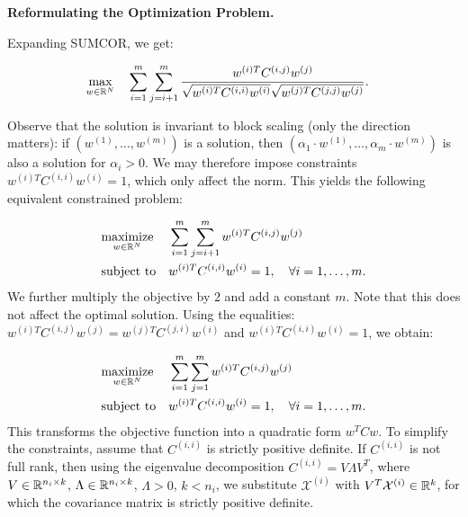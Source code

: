\noindent\textbf{Reformulating the Optimization Problem.}
\begin{sloppypar}
Expanding SUMCOR, we get:

\begin{equation*}
\begin{aligned}
& \underset{w \in \mathbb{R}^N}{\text{max}} & & \sum_{i = 1}^m
  \sum_{j = i+1}^m \frac{w^{(i)T} C^{(i,j)}
    w^{(j)}}{\sqrt{w^{(i)T} C^{(i,i)} w^{(i)}} \sqrt{w^{(j)T}
      C^{(j,j)} w^{(j)}}}.
\end{aligned}
\end{equation*}

Observe that the solution is invariant to block scaling (only the direction matters):
if $\left(w^{(1)}, \ldots, w^{(m)}\right)$ is a solution, then
$\left(\alpha_1 \cdot w^{(1)}, \ldots, \alpha_m \cdot w^{(m)}\right)$ is also a
solution for $\alpha_i > 0$. We may therefore impose constraints $w^{(i)T}C^{(i,i)}w^{(i)} = 1$,
which only affect the norm.
This yields the following  equivalent constrained problem:
\end{sloppypar} 
\begin{equation}\label{eq:qcqp0}
\begin{aligned}
& \underset{w \in \mathbb{R}^N}{\text{maximize}}
& & \sum_{i = 1}^m \sum_{j = i+1}^m w^{(i)T} C^{(i,j)} w^{(j)}\\
& \text{subject to}
& &w^{(i)T} C^{(i,i)} w^{(i)} = 1, \quad\forall i = 1,\ldots, m.
\end{aligned}
\end{equation}
We further multiply the objective by $2$ and add a constant $m$. Note that this does not
affect the optimal solution. Using the equalities: $w^{(i)T} C^{(i,j)} w^{(j)} = w^{(j)T} C^{(j,i)} w^{(i)}$
and $w^{(i)T} C^{(i,i)} w^{(i)} = 1$, we obtain:

\begin{equation}\label{eq:qcqp05}
\begin{aligned}
& \underset{w \in \mathbb{R}^N}{\text{maximize}}
& & \sum_{i = 1}^m \sum_{j = 1}^m w^{(i)T} C^{(i,j)} w^{(j)}\\
& \text{subject to}
& &w^{(i)T} C^{(i,i)} w^{(i)} = 1, \quad\forall i = 1,\ldots, m.
\end{aligned}
\end{equation}
This transforms the objective function into a quadratic form $w^T C w$. To
simplify the constraints, assume that $C^{(i,i)}$ is strictly positive definite.
If $C^{(i,i)}$ is not full rank, then using the eigenvalue decomposition
$C^{(i,i)} = V \Lambda V^T$, where $V \in \mathbb{R}^{n_i \times k}$,
$\Lambda \in \mathbb{R}^{n_i \times k}$, $\Lambda > 0$, $k < n_i$,
we substitute $\mathcal{X}^{(i)}$ with $V^T \mathcal{X}^{(i)} \in \mathbb{R}^k$,
for which the covariance matrix is strictly positive definite.

